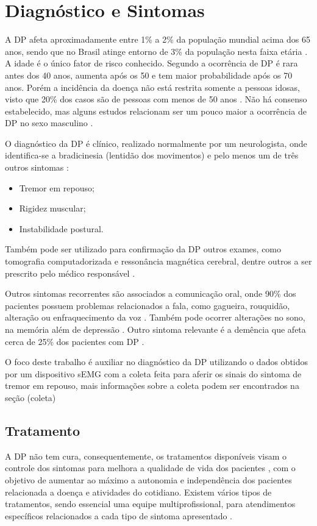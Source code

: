 \section{Diagnóstico e Sintomas}
A DP afeta aproximadamente entre 1\% a 2\% da população mundial acima dos 65 anos, sendo que no Brasil atinge entorno de 3\% da população nesta faixa etária \cite{magalhaes2009descobrindo}. A idade é o único fator de risco conhecido. Segundo  a ocorrência de DP é rara antes dos 40 anos, aumenta após os 50 e tem maior probabilidade após os 70 anos. Porém a incidência da doença não está restrita somente a pessoas idosas, visto que 20\% dos casos são de pessoas com menos de 50 anos \cite{gago2014manual}. Não há consenso estabelecido, mas alguns estudos relacionam ser um pouco maior a ocorrência de DP no sexo masculino \cite{peixinho2006alteraccoes}.

O diagnóstico da DP é clínico, realizado normalmente por um neurologista, onde identifica-se a bradicinesia (lentidão dos movimentos) e pelo menos um de três outros sintomas \cite{gago2014manual}:
\begin{itemize}
	\item Tremor em repouso;
	\item Rigidez muscular;
	\item Instabilidade postural.
\end{itemize}

Também pode ser utilizado para confirmação da DP outros exames, como tomografia computadorizada e ressonância magnética cerebral, dentre outros a ser prescrito pelo médico responsável \cite{gago2014manual}.

Outros sintomas recorrentes são associados a comunicação oral, onde 90\% dos pacientes possuem problemas relacionados a fala, como gagueira, rouquidão, alteração ou enfraquecimento da voz \cite{zarzur2010laryngeal}. Também pode ocorrer alterações no sono, na memória além de depressão \cite{barbosa2005parkinsons}. Outro sintoma relevante é a demência que afeta cerca de 25\% dos pacientes com DP \cite{pamplona1996demencia}.

O foco deste trabalho é auxiliar no diagnóstico da DP utilizando o dados obtidos por um dispositivo sEMG com a coleta feita para aferir os sinais do sintoma de tremor em repouso, mais informações sobre a coleta podem ser encontrados na seção (coleta)

\subsection{Tratamento}
A DP não tem cura, consequentemente, os tratamentos disponíveis visam o controle dos sintomas para melhora a qualidade de vida dos pacientes \cite{pamplona1996demencia}, com o objetivo de aumentar ao máximo a autonomia e independência dos pacientes relacionada a doença e atividades do cotidiano. Existem vários tipos de tratamentos, sendo essencial uma equipe multiprofissional, para atendimentos específicos relacionados a cada tipo de sintoma apresentado \cite{saito2011doencca}.